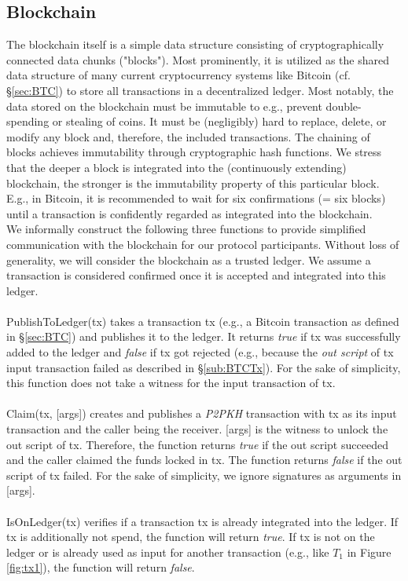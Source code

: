 \documentclass{cacthesis}
\newcounter{protocol}
\begin{document}
        
        \subsection{Blockchain}
        \label{sub:Blockchain}
        
        The blockchain itself is a simple data structure consisting of cryptographically connected data chunks ("blocks"). Most prominently, it is utilized as the shared data structure of many current cryptocurrency systems like Bitcoin (cf. §\ref{sec:BTC}) to store all transactions in a decentralized ledger. Most notably, the data stored on the blockchain must be immutable to e.g., prevent double-spending or stealing of coins. It must be (negligibly) hard to replace, delete, or modify any block and, therefore, the included transactions. The chaining of blocks achieves immutability through cryptographic hash functions. We stress that the deeper a block is integrated into the (continuously extending) blockchain, the stronger is the immutability property of this particular block. E.g., in Bitcoin, it is recommended to wait for six confirmations (= six blocks) until a transaction is confidently regarded as integrated into the blockchain. \\
        We informally construct the following three functions to provide simplified communication with the blockchain for our protocol participants. Without loss of generality, we will consider the blockchain as a trusted ledger. We assume a transaction is considered confirmed once it is accepted and integrated into this ledger. \\\\ 
        \textsf{PublishToLedger(tx)} takes a transaction \textsf{tx} (e.g., a Bitcoin transaction as defined in §\ref{sec:BTC}) and publishes it to the ledger. It returns \textit{true} if \textsf{tx} was successfully added to the ledger and \textit{false} if \textsf{tx} got rejected (e.g., because the \textit{out script} of \textsf{tx} input transaction failed as described in §\ref{sub:BTCTx}). For the sake of simplicity, this function does not take a witness for the input transaction of  \textsf{tx}. \\\\ 
        \textsf{Claim(tx, [args])} creates and publishes a \textit{P2PKH} transaction with \textsf{tx} as its input transaction and the caller being the receiver. \textsf{[args]} is the witness to unlock the out script of \textsf{tx}. Therefore, the function returns \textit{true} if the out script succeeded and the caller claimed the funds locked in \textsf{tx}. The function returns \textit{false} if the out script of \textsf{tx} failed. For the sake of simplicity, we ignore signatures as arguments in \textsf{[args]}.\\\\ 
        \textsf{IsOnLedger(tx)} verifies if a transaction \textsf{tx} is already integrated into the ledger. If \textsf{tx} is additionally not spend, the function will return \textit{true}. If \textsf{tx} is not on the ledger or is already used as input for another transaction (e.g., like $T_1$ in Figure \ref{fig:tx1}), the function will return \textit{false}.
        
\end{document}
